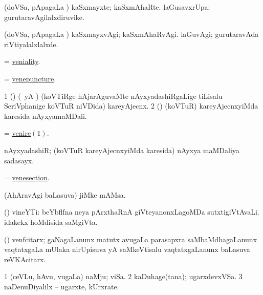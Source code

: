 \bentry
{} 
\gl{\nA}
\expl{}
\bmng
 (doVSa, pApagaLa \vi) 
\banum
{} kaSxmayxte; kaSxmAhaRte. 
 laGusavxrUpa; gurutaravAgilalxdiruvike. 
\eanum
\emng
\eentry

\bentry
{} 
\gl{\kirxvi}
\expl{}
\bmng
 (doVSa, pApagaLa \vi) 
\banum
{} kaSxmayxvAgi; kaSxmAhaRvAgi. 
 laGuvAgi; gurutaravAda riVtiyalalxlalxde. 
\eanum
\emng
\eentry

\bentry
{} 
\gl{\nA}
\expl{}
\bmng
 = \hyperlink{veniality}{veniality}. 
\emng
\eentry

\bentry
{} 
\gl{\nA}
\expl{}
\bmng
= \hyperlink{venepuncture}{venepuncture}. 
\emng
\eentry

\bentry
{} 
\gl{\nA}
\expl{}
\bmng
\bnum
\num{1} (\nAyxshA) (\ca\ yA \ame) (koVTiRge hAjarAguvaMte nAyxyadashiRgaLige tiLisalu SeriVphanige koVTuR niVDida) kareyAjecnx. 
\num{2} (\ame) (koVTuR) kareyAjecnxyiMda karesida nAyxyamaMDali. 
\enum
\emng
\eentry

\bentry
{} 
\gl{\nA}
\expl{}
\bmng
 = \hyperlink{venire}{venire\((1)\)}. 
\emng
\eentry

\bentry
{} 
\gl{\nA}
\expl{}
\bmng
 nAyxyadashiR; (koVTuR kareyAjecnxyiMda karesida) nAyxya maMDaliya sadasayx. 
\emng
\eentry

\bentry
{} 
\gl{\nA}
\expl{}
\bmng
 = \hyperlink{venesection}{venesection}. 
\emng
\eentry

\bentry
{} 
\gl{\nA}
\expl{}
\bmng
 (AhAravAgi baLasuva) jiMke mAMsa. 
\emng
\eentry

\bentry
{} 
\gl{\nA}
\expl{}
\bmng
 (\ca) vineYTi: 
\banum
{} beYbflfna neya pArxthaRnA giVteyanonxLagoMDa sutxtigiVtAvaLi. 
 idakekx hoMdisida saMgiVta. 
\eanum
\emng
\eentry

\bentry
{} 
\gl{\nA}
\expl{}
\bmng
 (\ga) venfcitarx; gaNagaLanunx matutx avugaLa parasapxra saMbaMdhagaLanunx vaqtatxgaLa mUlaka nirUpisuva yA saMkeVtisalu vaqtatxgaLanunx baLasuva reVKAcitarx. 
\emng
\eentry

\bentry
{} 
\gl{\nA}
\expl{}
\bmng
\bnum
\num{1} (ceVLu, hAvu, \mo vugaLa) naMju; viSa. 
\num{2} kaDuhage(tana); ugarxdevxVSa. 
\num{3} naDenuDiyalilx -- ugarxte, kUrxrate. 
\enum
\emng
\eentry


